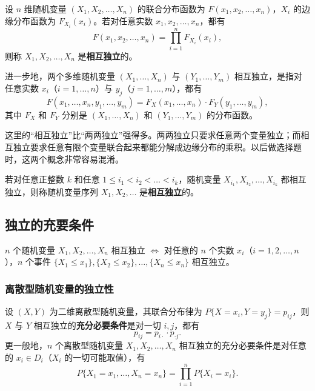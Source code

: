 ﻿\documentclass[lang=cn,11pt]{elegantbook}
\begin{document}
\begin{definition}[$n$ 个随机变量的相互独立性] \label{def:n-independence}
设 $n$ 维随机变量 $(X_1, X_2, \dots, X_n)$ 的联合分布函数为 $F(x_1, x_2, \dots, x_n)$，$X_i$ 的边缘分布函数为 $F_{X_i}(x_i)$。若对任意实数 $x_1, x_2, \dots, x_n$，都有
\[
F(x_1, x_2, \dots, x_n) = \prod_{i=1}^{n}F_{X_i}(x_i),
\]
则称 $X_1, X_2, \dots, X_n$ 是\textbf{相互独立}的。

进一步地，两个多维随机变量 $(X_1, \dots, X_n)$ 与 $(Y_1, \dots, Y_m)$ 相互独立，是指对任意实数 $x_i$（$i=1,\dots,n$）与 $y_j$（$j=1,\dots,m$），都有
\[
F(x_1, \dots, x_n, y_1, \dots, y_m) = F_X(x_1, \dots, x_n) \cdot F_Y(y_1, \dots, y_m),
\]
其中 $F_X$ 和 $F_Y$ 分别是 $(X_1, \dots, X_n)$ 和 $(Y_1, \dots, Y_m)$ 的分布函数。
\end{definition}

\begin{note}
这里的“相互独立”比“两两独立”强得多。两两独立只要求任意两个变量独立；而相互独立要求任意有限个变量联合起来都能分解成边缘分布的乘积。以后做选择题时，这两个概念非常容易混淆。
\end{note}

\begin{definition}[随机变量序列的独立性]\label{def:sequence-independence} 
若对任意正整数 $k$ 和任意 $1 \leqslant i_1 < i_2 < \dots < i_k$，随机变量 $X_{i_1}, X_{i_2}, \dots, X_{i_k}$ 都相互独立，则称随机变量序列 $X_1, X_2, \dots$ 是\textbf{相互独立}的。
\end{definition}

\subsection{独立的充要条件}

$n$ 个随机变量 $X_1, X_2, \dots, X_n$ 相互独立
$\iff$ 对任意的 $n$ 个实数 $x_i$（$i=1,2,\dots,n$），$n$ 个事件 $\{X_1 \leqslant x_1\}, \{X_2 \leqslant x_2\}, \dots, \{X_n \leqslant x_n\}$ 相互独立。

\subsubsection{离散型随机变量的独立性}

\begin{theorem}[离散型随机变量独立的判定]\label{thm:discrete-independence}
设 $(X,Y)$ 为二维离散型随机变量，其联合分布律为 $P\{X = x_i, Y = y_j\} = p_{ij}$，则 $X$ 与 $Y$ 相互独立的\textbf{充分必要条件}是对一切 $i, j$，都有
\[
p_{ij} = p_{i\cdot} \cdot p_{\cdot j}.
\]
更一般地，$n$ 个离散型随机变量 $X_1, X_2, \dots, X_n$ 相互独立的充分必要条件是对任意的 $x_i \in D_i$（$X_i$ 的一切可能取值），有
\[
P\{X_1 = x_1, \dots, X_n = x_n\} = \prod_{i=1}^{n}P\{X_i = x_i\}.
\]
\end{theorem}
\end{document}
